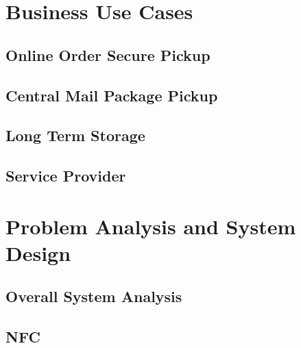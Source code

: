 \documentclass[12pt]{report}
\begin{document}
\chapter{Business Use Cases}


\section{Online Order Secure Pickup}


\section{Central Mail Package Pickup}


\section{Long Term Storage}


\section{Service Provider}


\chapter{Problem Analysis and System Design}


\section{Overall System Analysis}


\section{NFC}
\end{document}
